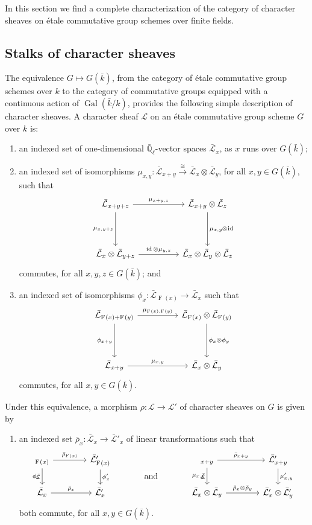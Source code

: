 \documentclass[10pt]{amsart}
\makeatletter
\theoremstyle{plain}
\theoremstyle{definition}
\newcommand{\EE}{\mathbb{\bar Q}_\ell}
\newcommand{\bFq}{\bar{k}}
\newcommand{\Fq}{k}
\DeclareMathOperator{\Gal}{Gal}
\newcommand{\Frob}[1]{\operatorname{F}_{#1}}
\DeclareMathOperator{\id}{id}
\newcommand{\iso}{{\ \cong\ }}
\newcommand{\cs}[1]{{\mathcal{#1}}}
\newcommand{\gcs}[1]{{\mathcal{\bar #1}}}
\newcommand{\labitem}[2]{
\def\@itemlabel{\textbf{#1}}
\item
\def\@currentlabel{#1}\label{#2}}
\newcommand{\brho}{{\bar\rho}}
\newcommand{\tight}[3]{\hspace{-#1pt}{#2}\hspace{-#3pt}}
\makeatother
\begin{document}
In this section we find a complete characterization of the category of character sheaves on \'etale commutative group schemes over finite fields.

\subsection{Stalks of character sheaves}\label{ssec:stalks}

The equivalence $G \mapsto G(\bFq)$,
from the category of \'etale commutative group schemes over $\Fq$ to the category of commutative groups equipped
with a continuous action of $\Gal(\bFq/\Fq)$,
provides the following simple description of character sheaves.
%
A character sheaf $\cs{L}$ on an \'etale commutative group scheme $G$ over $\Fq$ is:
\begin{enumerate}
 \labitem{(cs.1)}{cs.1} an indexed set of one-dimensional
  $\EE$-vector spaces $\gcs{L}_x$, as $x$ runs over
  $G(\bFq)$;

 \labitem{(cs.2)}{cs.2} an indexed set of isomorphisms
  $\mu_{x,y} : \gcs{L}_{x+y} \xrightarrow{\iso} \gcs{L}_{x} \otimes\gcs{L}_{y}$,
  for all $x,y \in G(\bFq)$, such that
  \[
   \begin{tikzcd}[row sep=40]
    \gcs{L}_{x+y+z} \arrow{rr}{\mu_{x+y,z}} \arrow[swap]{d}{\mu_{x,y+z}}
    && \gcs{L}_{x+y}\otimes\gcs{L}_{z} \dar{\mu_{x,y} \tight{0.5}{\otimes}{1} \id} \\
    \gcs{L}_{x} \otimes\gcs{L}_{y+z} \arrow{rr}{\id \otimes\mu_{y,z}}
    && \gcs{L}_{x} \otimes\gcs{L}_{y} \otimes\gcs{L}_{z}
   \end{tikzcd}
  \]
  commutes, for all $x,y,z\in G(\bFq)$; and
 \labitem{(cs.3)}{cs.3} an indexed set of isomorphisms $\phi_{x} : \gcs{L}_{\Frob{}(x)} \to \gcs{L}_x$
  such that
  \[
   \begin{tikzcd}[row sep=40]
    \gcs{L}_{\Frob{}(x)+\Frob{}(y)} \arrow[swap]{d}{\phi_{x+y}} \arrow{rr}{\mu_{\Frob{}(x),\Frob{}(y)}}
    && \gcs{L}_{\Frob{}(x)}\otimes\gcs{L}_{\Frob{}(y)} \dar{\phi_x \tight{0}{\otimes}{0} \phi_y} \\
    \gcs{L}_{x+y} \arrow{rr}{\mu_{x,y}}
    && \gcs{L}_x \otimes\gcs{L}_y
   \end{tikzcd}
  \]
  commutes, for all $x,y\in G(\bFq)$.
\end{enumerate}
Under this equivalence, a morphism $\rho : \cs{L} \to \cs{L'}$ of character sheaves on $G$ is given by
\begin{enumerate}
 \labitem{(cs.4)}{cs.4} an indexed set $\brho_x : \gcs{L}_x \to \gcs{L'}_x$
  of linear transformations such that
  \[
   \begin{tikzcd}[column sep=40]
    \arrow[swap]{d}{\phi_x} \gcs{L}_{\Frob{}(x)} \rar{\brho_{\Frob{}(x)}} & \gcs{L'}_{\Frob{}(x)} \dar{\phi_x'}
    &\arrow[draw=none]{d}[pos=.4,description]{\text{\normalsize{and}}}
    & \arrow[swap]{d}{\mu_{x,y}} \gcs{L}_{x+y} \rar{\brho_{x+y}} & \gcs{L'}_{x+y} \dar{\mu'_{x,y}} \\
    \gcs{L}_x \rar{\brho_x} & \gcs{L'}_x
    & {} & \gcs{L}_x\otimes\gcs{L}_y \rar{\brho_x\otimes\brho_y} & \gcs{L'}_x \otimes\gcs{L'}_y
   \end{tikzcd}
  \]
  both commute, for all $x, y \in G(\bFq)$.
\end{enumerate}
\end{document}
